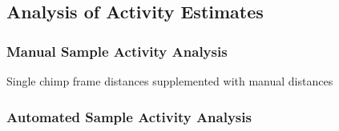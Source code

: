 \subsection{Analysis of Activity Estimates}

\subsubsection{Manual Sample Activity Analysis}
Single chimp frame distances supplemented with manual distances

\subsubsection{Automated Sample Activity Analysis}
